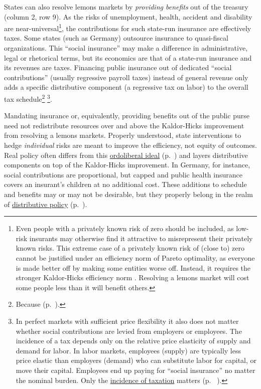 States can also resolve lemons markets by \emph{providing benefits} out of the treasury (column 2, row 9). As the risks of unemployment, health, accident and disability are near-universal\footnote{
	Even people with a privately known risk of zero should be included, as low-risk insurants may otherwise find it attractive to misrepresent their privately known risks. This extreme case of a privately known risk of (close to) zero cannot be justified under an efficiency norm of Pareto optimality, as everyone is made better off by making some entities worse off. Instead, it requires the stronger Kaldor-Hicks efficiency norm \citep{Kaldor1939,Hicks1939}. Resolving a lemons market will cost some people less than it will benefit others.}, 
the contributions for such state-run insurance are effectively taxes. Some states (such as Germany) outsource insurance to quasi-fiscal organizations. This ``social insurance'' may make a difference in administrative, legal or rhetorical terms, but its economics are that of a state-run insurance and its revenues are taxes. Financing public insurance out of dedicated ``social contributions'' (usually regressive payroll taxes) instead of general revenue only adds a specific distributive component (a regressive tax on labor) to the overall tax schedule\footnote{
	Because  (p.~\pageref{sec:redistribution-and-revenue-are-one}).}
\footnote{
	In perfect markets with sufficient price flexibility it also does not matter whether social contributions are levied from employers or employees. The incidence of a tax depends only on the relative price elasticity of supply and demand for labor. In labor markets, employees (supply) are typically less price elastic than employers (demand) who can substitute labor for capital, or move their capital. Employees end up paying for ``social insurance'' no matter the nominal burden. Only the \hyperref[sec:well-determined-incidence]{incidence of taxation} matters (p.~ \pageref{sec:well-determinedincidence}).}.
	
Mandating insurance or, equivalently, providing benefits out of the public purse need not redistribute resources over and above the Kaldor-Hicks improvement from resolving a lemons markets. Properly understood, state interventions to hedge \emph{individual} risks are meant to improve the efficiency, not equity of outcomes. Real policy often differs from this \hyperref[sec:ordoliberalhygiene]{ordoliberal ideal} (p.~\pageref{sec:ordoliberalhygiene}) and layers distributive components on top of the Kaldor-Hicks improvement. In Germany, for instance, social contributions are proportional, but capped and public health insurance covers an insurant's children at no additional cost. These additions to schedule and benefits may or may not be desirable, but they properly belong in the realm of \hyperref[sec:distribution]{distributive policy} (p.~\pageref{sec:distribution}).

